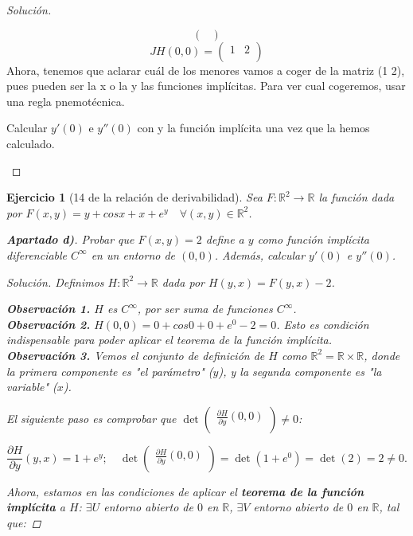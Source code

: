 \documentclass[11pt, a4paper, titlepage]{article}
\newcommand{\pder}[2][]{\frac{\partial#1}{\partial#2}}
\theoremstyle{exercise-style}
\newtheorem*{ejer}{Ejercicio}
\newenvironment{nlist}
{\begin{enumerate}
\renewcommand\labelenumi{(\emph{\roman{enumi})}}}
{\end{enumerate}}
\theoremstyle{theorem-style}
\begin{document}
\begin{proof}[Solución]
\begin{nlist}
\[\begin{pmatrix}
\end{pmatrix} 
\]
\[
JH(0,0)= \begin{pmatrix}
 1 & 2 \\
\end{pmatrix} 
\]
Ahora, tenemos que aclarar cuál de los menores vamos a coger de la matriz (1   2), pues pueden ser la x o la y las funciones implícitas. Para ver cual cogeremos, usar una regla pnemotécnica.

Calcular $y'(0)$ e $y''(0)$ con y la función implícita una vez que la hemos calculado.
\end{nlist}
\end{proof}

\begin{ejer}[14 de la relación de derivabilidad]
Sea $F:\mathbb{R}^2 \longrightarrow \mathbb{R}$ la función dada por $F(x,y) = y + cosx + x + e^y \quad \forall(x,y)\in \mathbb{R}^2$.

\textbf{Apartado d)}. Probar que $F(x,y)=2$ define a $y$ como función implícita diferenciable $C^{\infty}$ en un entorno de $(0,0)$. Además, calcular $y'(0)$ e $y''(0)$.

\begin{proof}[Solución]
Definimos $H:\mathbb{R}^2 \longrightarrow \mathbb{R}$ dada por $H(y,x)=F(y,x)-2$.

\textbf{Observación 1.} $H$ es $C^{\infty}$, por ser suma de funciones $C^{\infty}$.\\
\textbf{Observación 2.} $H(0,0) = 0 + cos0 + 0 + e^0 - 2 = 0$. Esto es condición indispensable para poder aplicar el \textit{teorema de la función implícita}.\\
\textbf{Observación 3.} Vemos el conjunto de definición de $H$ como $\mathbb{R}^2 = \mathbb{R} \times \mathbb{R}$, donde la primera componente es "\textit{el parámetro"} ($y$), y la segunda componente es \textit{"la variable"} ($x$).

El siguiente paso es comprobar que $\displaystyle \det \begin{pmatrix}
	\pder[H]{y}(0,0)\\
\end{pmatrix} \ne 0$:

$$\pder[H]{y}(y,x) = 1 + e^y;\quad \det \begin{pmatrix}
	\pder[H]{y}(0,0)\\
\end{pmatrix} = \det \left( 1 + e^0 \right) = \det (2) = 2 \ne 0.$$

Ahora, estamos en las condiciones de aplicar el \textbf{teorema de la función implícita} a $H$:
$\exists U$ entorno abierto de $0$ en $\mathbb{R}$, $\exists V$ entorno abierto de $0$ en $\mathbb{R}$, tal que:


\end{proof}
\end{ejer}
\end{document}
